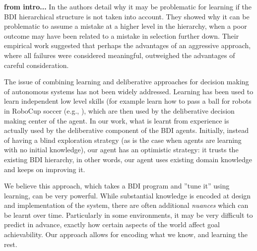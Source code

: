 





\bigskip\bigskip\bigskip\bigskip
\textbf{from intro...}
In \cite{APSS08} the authors detail why it may be problematic for
learning if the BDI hierarchical structure is not taken into account.
They showed why it can be problematic to assume a mistake at a
higher level in the hierarchy, when a poor outcome may have been
related to a mistake in selection further down.  Their
empirical work suggested that perhaps the advantages of an aggressive
approach, where all failures were considered meaningful, outweighed
the advantages of careful consideration.


The issue of combining learning and deliberative approaches for decision
making of autonomous systems has not been widely addressed. Learning
has been used to learn independent low level skills (for example learn
how to pass a ball for robots in RoboCup soccer (e.g., \cite{Riedmiller01}), which are
then used by the deliberative decision making center of the agent.  In
our work, what is learnt from experience is actually used by the
deliberative component of the BDI agents. Initially, instead of having
a blind exploration strategy 
(as is the case when agents are learning with no initial knowledge), 
our agent has an optimistic strategy: it trusts the existing BDI hierarchy, in other
words, our agent uses existing domain knowledge and keeps on improving
it.

We believe this approach, which takes a BDI program and 
''tune it'' using learning, can be very powerful. While substantial
knowledge is encoded at design and implementation of the system, there
are often additional \textit{nuances} which can be learnt over
time. Particularly in some environments, it may be very difficult to
predict in advance, exactly how certain aspects of the world affect
goal achievability. Our approach allows for encoding what we know,
and learning the rest.

